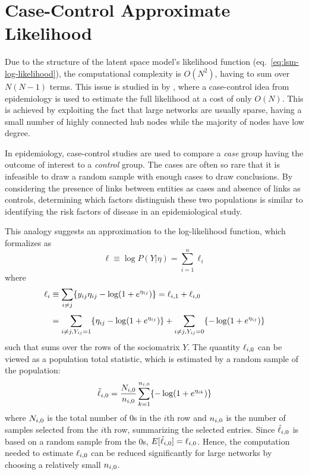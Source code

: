\section{Case-Control Approximate Likelihood}

Due to the structure of the latent space model's likelihood function (eq.~\ref{eq:lsm-log-likelihood}), the computational complexity is $O(N^2)$, having to sum over $N(N-1)$ terms. This issue is studied in \cite{raftery2012fast} by \citeauthor{raftery2012fast}, where a case-control idea from epidemiology is used to estimate the full likelihood at a cost of only $O(N)$. This is achieved by exploiting the fact that large networks are usually sparse, having a small number of highly connected hub nodes while the majority of nodes have low degree.

In epidemiology, case-control studies are used to compare a \emph{case} group having the outcome of interest to a \emph{control} group. The cases are often so rare that it is infeasible to draw a random sample with enough cases to draw conclusions.
By considering the presence of links between entities as cases and absence of links as controls, determining which factors distinguish these two populations is similar to identifying the risk factors of disease in an epidemiological study.

This analogy suggests an approximation to the log-likelihood function, which \citeauthor*{raftery2012fast} formalizes as
\begin{equation}
\label{eq:case-likelihood-approx}
    \ell \equiv \log P(Y|\eta)=\sum_{i=1}^n \ell_i
\end{equation}
where
\begin{equation}
    \setlength{\jot}{0.5\baselineskip}
    \begin{split}
        \ell_i &\equiv \sum_{i\neq j}\{\sub(y)\sub(\eta)-\log(1+e^{\sub(\eta)})\} = \sub(\ell)(i,1) + \sub(\ell)(i,0)\\
        &= \sum_{i\neq j, \sub(Y)=1} \{\sub(\eta)-\log(1+e^{\sub(\eta)}) \} + \sum_{i\neq j, \sub(Y)=0} \{-\log(1+e^{\sub(\eta)}) \} \\
    \end{split}
\end{equation}
such that  sums over the rows of the sociomatrix $Y$. The quantity $\sub(\ell)(i,0)$ can be viewed as a population total statistic, which is estimated by a random sample of the population:
\begin{equation}
    \sub(\tilde{\ell})(i,0)=\frac{\sub(N)(i,0)}{\sub(n)(i,0)} \sum_{k=1}^{\sub(n)(i,0)} \{ -\log(1+e^{\sub(\eta)(ik)}) \}
\end{equation}
where $\sub(N)(i,0)$ is the total number of 0s in the $i$th row and $\sub(n)(i,0)$ is the number of samples selected from the $i$th row, summarizing the selected entries. Since $\sub(\tilde{\ell})(i,0)$ is based on a random sample from the 0s, $E[\sub(\tilde{\ell})(i,0)] = \sub(\ell)(i,0)$. Hence, the computation needed to estimate $\sub(\ell)(i,0)$ can be reduced significantly for large networks by choosing a relatively small $\sub(n)(i,0)$.

